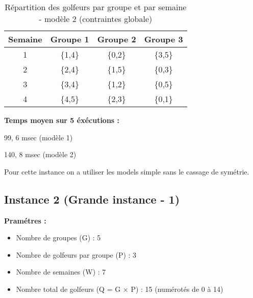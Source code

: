 \documentclass{article}
\begin{document}
\begin{table}[h]
\centering
\begin{tabular}{c|ccc}
\toprule
Semaine & Groupe 1 & Groupe 2 & Groupe 3 \\
\midrule
1 & \{1,4\} & \{0,2\} & \{3,5\} \\
2 & \{2,4\} & \{1,5\} & \{0,3\} \\
3 & \{3,4\} & \{1,2\} & \{0,5\} \\
4 & \{4,5\} & \{2,3\} & \{0,1\} \\
\bottomrule
\end{tabular}
\caption{Répartition des golfeurs par groupe et par semaine - modèle 2 (contraintes globale)}
\end{table}

\item \textbf{Temps moyen sur 5 éxécutions : }

99, 6 msec (modèle 1)

140, 8 msec (modèle 2)

Pour cette instance on a utiliser les models simple sans le cassage de symétrie.

\subsection{Instance 2 (Grande instance - 1)}
\item \textbf{Pramétres :}
\begin{itemize}
  \item Nombre de groupes (G) : 5
  \item Nombre de golfeurs par groupe (P) : 3
  \item Nombre de semaines (W) : 7
  \item Nombre total de golfeurs (Q = G × P) : 15 (numérotés de 0 à 14)
\end{itemize}
    
\end{document}
